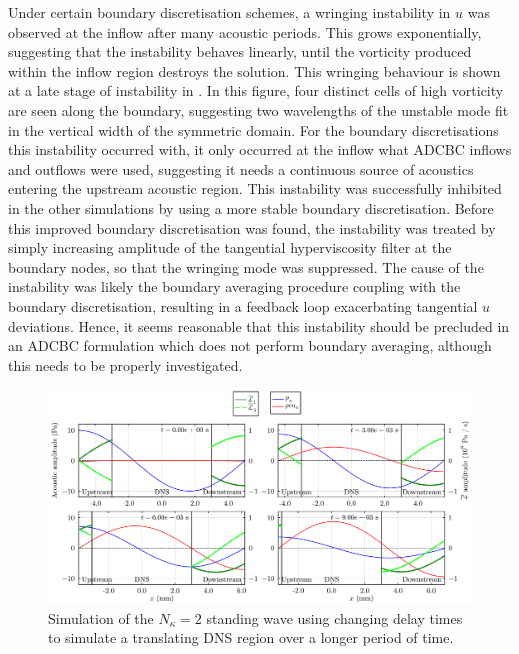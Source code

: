 Under certain boundary discretisation schemes, a wringing instability in $u$ was observed at the inflow after many acoustic periods. This grows exponentially, suggesting that the instability behaves linearly, until the vorticity produced within the inflow region destroys the solution. This wringing behaviour is shown at a late stage of instability in . In this figure, four distinct cells of high vorticity are seen along the boundary, suggesting two wavelengths of the unstable mode fit in the vertical width of the symmetric domain. For the boundary discretisations this instability occurred with, it only occurred at the inflow what ADCBC inflows and outflows were used, suggesting it needs a continuous source of acoustics entering the upstream acoustic region. This instability was successfully inhibited in the other simulations by using a more stable boundary discretisation. Before this improved boundary discretisation was found, the instability was treated by simply increasing amplitude of the tangential hyperviscosity filter at the boundary nodes, so that the wringing mode was suppressed. The cause of the instability was likely the boundary averaging procedure coupling with the boundary discretisation, resulting in a feedback loop exacerbating tangential $u$ deviations. Hence, it seems reasonable that this instability should be precluded in an ADCBC formulation which does not perform boundary averaging, although this needs to be properly investigated.

\begin{figure}[t]
\centering
\includegraphics[scale=0.30]{assets/graphs/ac-plot-3-4_moving.pdf}
\caption{Simulation of the $N_κ = 2$ standing wave using changing delay times to simulate a translating DNS region over a longer period of time.}
\label{fig:moving-dns-region}
\end{figure}

